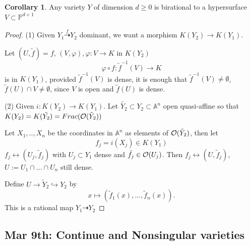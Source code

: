 \documentclass[11pt]{article}
\theoremstyle{definition}
\newtheorem{cor}[thm]{Corollary}
\newcommand{\affn}{\mathbb A}
\newcommand{\proj}{\mathbb P}
\newcommand{\calo}{{\cal O}}
\newcommand{\lrta}{\longrightarrow}
\newcommand{\llrta}{\longleftrightarrow}
\newcommand{\inj}{\hookrightarrow}
\begin{document}
\begin{cor}
Any variety $Y$ of dimension $d\geq 0$ is birational to a hypersurface $V\subset \proj^{d+1}$
\end{cor}
\begin{proof}
(1) Given $Y_1\overset{f}{\dashrightarrow}Y_2$ dominant, we want a morphism
$K(Y_2)\lrta K(Y_1)$.

 Let $(U,\tilde{f})=f$, $(V,\varphi),\varphi:V\lrta K$ in $K(Y_2)$
$$
\varphi\circ f: \tilde{f}^{-1}(V)\lrta K
$$ 
 is in $K(Y_1)$, provided $\tilde{f}^{-1}(V)$ is dense, it is enough that $\tilde{f}^{-1}(V)\neq \emptyset$, $\tilde{f}(U)\cap V\neq \emptyset$, since $V$ is open and $\tilde{f}(U)$ is dense.

 (2) Given $i: K(Y_2)\lrta K(Y_1)$. Let $\tilde{Y_2}\subset Y_2\subset \affn^n$ open quasi-affine so that $K(Y_2)=K(\tilde{Y_2})=Frac(\calo(\tilde{Y}_2))$

 Let $X_1,..,X_n$ be the coordinates  in $\affn^n$ as elements of $\calo(\tilde{Y}_2)$, then let
 $$
f_j =i (X_j)\in K(Y_1)
 $$
 $f_j\llrta (U_j,\tilde{f}_j)$ with $U_j\subset Y_1$ dense and $\tilde{f}_j\in\calo(U_j)$. Then 
 $f_j\llrta (U,\tilde{f}_j)$, $U:=U_1\cap ...\cap U_n$ still dense.

 Define $U\lrta \tilde{Y}_2\inj Y_2$ by
 $$
x\longmapsto (\tilde{f}_1(x),...,\tilde{f}_n(x)).
 $$
This is a rational map $Y_1\dashrightarrow Y_2$

\end{proof}

\subsection{Mar 9th: Continue and Nonsingular varieties}
\end{document}
